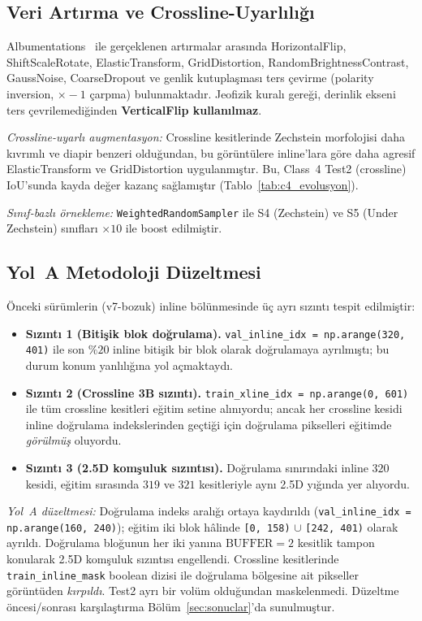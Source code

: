 \documentclass[conference,a4paper,10pt]{IEEEtran}
\begin{document}
\subsection{Veri Artırma ve Crossline-Uyarlılığı}

Albumentations~\cite{albumentations} ile gerçeklenen artırmalar arasında
HorizontalFlip, ShiftScaleRotate, ElasticTransform, GridDistortion,
RandomBrightnessContrast, GaussNoise, CoarseDropout ve genlik kutuplaşması ters
çevirme (polarity inversion, $\times -1$ çarpma) bulunmaktadır.
Jeofizik kuralı gereği, derinlik ekseni ters çevrilemediğinden \textbf{VerticalFlip
kullanılmaz}.

\textit{Crossline-uyarlı augmentasyon:} Crossline kesitlerinde Zechstein
morfolojisi daha kıvrımlı ve diapir benzeri olduğundan, bu görüntülere
inline'lara göre daha agresif ElasticTransform ve GridDistortion uygulanmıştır.
Bu, Class~4 Test2 (crossline) IoU'sunda kayda değer kazanç sağlamıştır
(Tablo~\ref{tab:c4_evolusyon}).

\textit{Sınıf-bazlı örnekleme:} \texttt{WeightedRandomSampler} ile S4 (Zechstein)
ve S5 (Under Zechstein) sınıfları $\times 10$ ile boost edilmiştir.

\subsection{Yol~A Metodoloji Düzeltmesi}
\label{sec:yola}

Önceki sürümlerin (v7-bozuk) inline bölünmesinde üç ayrı sızıntı tespit edilmiştir:

\begin{itemize}
\item \textbf{Sızıntı 1 (Bitişik blok doğrulama).} \texttt{val\_inline\_idx =
np.arange(320, 401)} ile son $\%20$ inline bitişik bir blok olarak doğrulamaya
ayrılmıştı; bu durum konum yanlılığına yol açmaktaydı.
\item \textbf{Sızıntı 2 (Crossline 3B sızıntı).} \texttt{train\_xline\_idx =
np.arange(0, 601)} ile tüm crossline kesitleri eğitim setine alınıyordu; ancak
her crossline kesidi inline doğrulama indekslerinden geçtiği için doğrulama
pikselleri eğitimde \emph{görülmüş} oluyordu.
\item \textbf{Sızıntı 3 (2.5D komşuluk sızıntısı).} Doğrulama sınırındaki inline
$320$ kesidi, eğitim sırasında $319$ ve $321$ kesitleriyle aynı 2.5D yığında
yer alıyordu.
\end{itemize}

\textit{Yol~A düzeltmesi:} Doğrulama indeks aralığı ortaya kaydırıldı
(\texttt{val\_inline\_idx = np.arange(160, 240)}); eğitim iki blok hâlinde
\texttt{[0, 158)} $\cup$ \texttt{[242, 401)} olarak ayrıldı. Doğrulama
bloğunun her iki yanına $\text{BUFFER}{=}2$ kesitlik tampon konularak 2.5D
komşuluk sızıntısı engellendi. Crossline kesitlerinde
\texttt{train\_inline\_mask} boolean dizisi ile doğrulama bölgesine ait
pikseller görüntüden \emph{kırpıldı}. Test2 ayrı bir volüm olduğundan
maskelenmedi. Düzeltme öncesi/sonrası karşılaştırma Bölüm~\ref{sec:sonuclar}'da
sunulmuştur.
\end{document}
